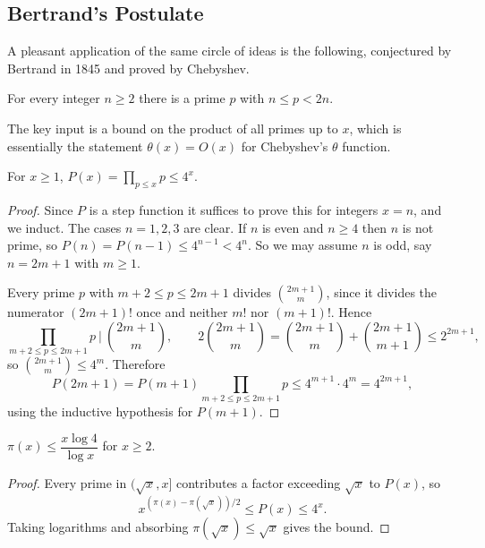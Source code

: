 \subsection{Bertrand's Postulate}

A pleasant application of the same circle of ideas is the following, conjectured by Bertrand in 1845 and proved by Chebyshev.

\begin{theorem}\label{thm:bertrand}
	For every integer $n \geq 2$ there is a prime $p$ with $n \leq p < 2n$.
\end{theorem}

The key input is a bound on the product of all primes up to $x$, which is essentially the statement $\theta(x) = O(x)$ for Chebyshev's $\theta$ function.

\begin{lemma}\label{lem:primeprod}
	For $x \geq 1$, $\displaystyle P(x) = \prod_{p \leq x}p \leq 4^x$.
\end{lemma}
\begin{proof}
	Since $P$ is a step function it suffices to prove this for integers $x = n$, and we induct. The cases $n = 1, 2, 3$ are clear. If $n$ is even and $n \geq 4$ then $n$ is not prime, so $P(n) = P(n-1) \leq 4^{n-1} < 4^n$. So we may assume $n$ is odd, say $n = 2m+1$ with $m \geq 1$.

	Every prime $p$ with $m + 2 \leq p \leq 2m+1$ divides $\binom{2m+1}m$, since it divides the numerator $(2m+1)!$ once and neither $m!$ nor $(m+1)!$. Hence
	$$
	\prod_{m+2 \leq p \leq 2m+1}p \ \Big| \ \binom{2m+1}m, \qquad 2\binom{2m+1}m = \binom{2m+1}m + \binom{2m+1}{m+1} \leq 2^{2m+1},
	$$
	so $\binom{2m+1}m \leq 4^m$. Therefore
	$$
	P(2m+1) = P(m+1)\prod_{m+2\leq p\leq 2m+1}p \leq 4^{m+1}\cdot 4^m = 4^{2m+1},
	$$
	using the inductive hypothesis for $P(m+1)$.
\end{proof}

\begin{corollary}
	$\pi(x) \leq \dfrac{x\log 4}{\log x}$ for $x \geq 2$.
\end{corollary}
\begin{proof}
	Every prime in $(\sqrt x, x]$ contributes a factor exceeding $\sqrt x$ to $P(x)$, so
	$$
	x^{(\pi(x) - \pi(\sqrt x))/2} \leq P(x) \leq 4^x.
	$$
	Taking logarithms and absorbing $\pi(\sqrt x) \leq \sqrt x$ gives the bound.
\end{proof}

